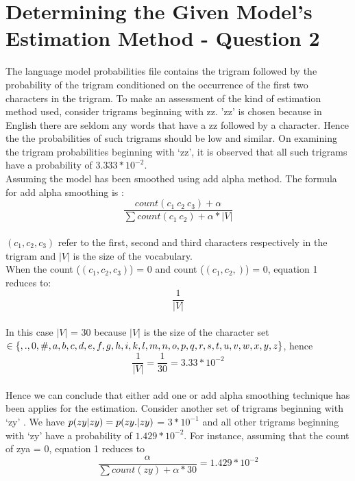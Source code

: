 \documentclass[12pt]{article}
\begin{document}
\section{Determining the Given Model's Estimation Method - Question 2} 
The language model probabilities file contains the trigram followed by the probability of the trigram conditioned on the occurrence of the first two characters in the trigram. To make an assessment of the kind of estimation method used, consider trigrams beginning with zz. 'zz' is chosen because in English there are seldom any words that have a zz followed by a character. Hence the the probabilities of such trigrams should be low and similar. On examining the trigram probabilities beginning with `zz', it is observed that all such trigrams have a probability of  
$3.333 * 10^{-2}$.\\
Assuming the model has been smoothed using add alpha method. The formula for add alpha smoothing is :
\begin{equation}
 \dfrac{{count(c_{1}\ c_{2}\ c_{3})} + \alpha} {\sum count(c_1\ c_2)+ \alpha * |V|} 
\end{equation}\\  
$(c_1,c_2,c_3)$ refer to the first, second and third characters respectively in the trigram and $|V|$ is the size of the vocabulary.\\
When the count ($(c_1,c_2,c_3)$) = 0 and count ($(c_1,c_2,)$) = 0, equation 1 reduces to:
\begin{equation}
\dfrac{1} {|V|} 
\end{equation}\\  
In this case $|V|$ = 30 because $|V|$ is the size of the character set $ \in \{  \space ,.,0,\#,a,b,c,d,e,f,g,h,i,\\k,l,m,n,o,p,q,r,s,t,u,v,w,x,y,z\}$, hence
\begin{equation}
\dfrac{1} {|V|}  = \dfrac{1} {30} = 3.33 * 10^{-2}
\end{equation}\\
Hence we can conclude that either add one or add alpha smoothing technique has been applies for the estimation. Consider another set of trigrams beginning with `zy' . We have $p(zy\space| zy) = p(zy. | zy)$ = $3 * 10^{-1}$ and all other trigrams beginning with `zy' have a probability of $1.429 * 10^{-2}$. For instance, assuming that the count of zya = 0, equation 1 reduces to  
\begin{equation}
\dfrac{ \alpha} {\sum count(zy)+ \alpha * 30} = 1.429 * 10^{-2}
\end{equation}\\
\end{document}
